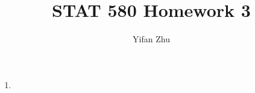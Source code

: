 \documentclass{article}
\begin{document}
	

	
	\title{STAT 580 Homework 3}
	\author{Yifan Zhu}
	\maketitle
	
	\begin{enumerate}[leftmargin = 0 em, label = \arabic*., font = \bfseries]
	\item 
	

 	\end{enumerate}


	
	
	
	
\end{document}
